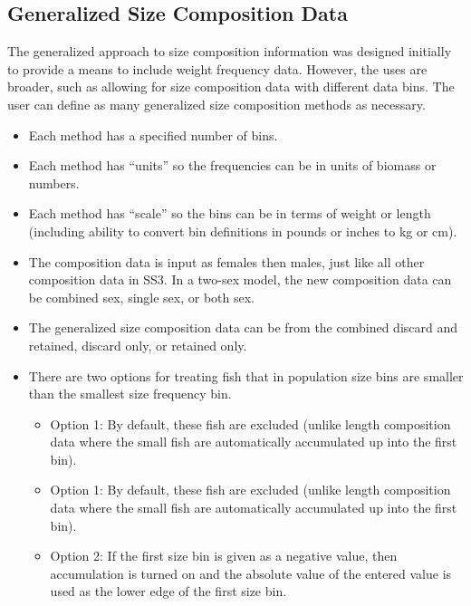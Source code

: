 \subsection{Generalized Size Composition Data}
The generalized approach to size composition information was designed initially to provide a means to include weight frequency data. However, the uses are broader, such as allowing for size composition data with different data bins. The user can define as many generalized size composition methods as necessary.

\begin{itemize}
	\item Each method has a specified number of bins.
	\item Each method has ``units'' so the frequencies can be in units of biomass or numbers.
	\item Each method has ``scale'' so the bins can be in terms of weight or length (including ability to convert bin definitions in pounds or inches to kg or cm). 
	\item The composition data is input as females then males, just like all other composition data in SS3. In a two-sex model, the new composition data can be combined sex, single sex, or both sex.
	\item The generalized size composition data can be from the combined discard and retained, discard only, or retained only.
	\item There are two options for treating fish that in population size bins are smaller than the smallest size frequency bin.
	\begin{itemize}
		\item Option 1: By default, these fish are excluded (unlike length composition data where the small fish are automatically accumulated up into the first bin).
		\item Option 1: By default, these fish are excluded (unlike length composition data where the small fish are automatically accumulated up into the first bin).
		\item Option 2: If the first size bin is given as a negative value, then accumulation is turned on and the absolute value of the entered value is used as the lower edge of the first size bin.
	\end{itemize}
\end{itemize}

